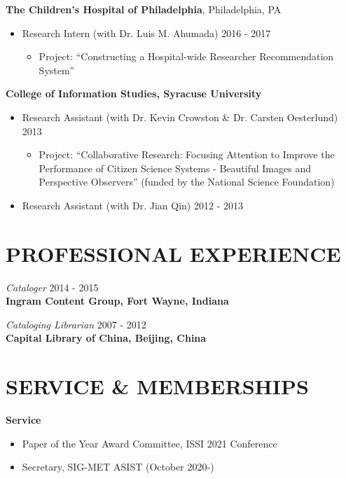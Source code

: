 \documentclass[margin, 10pt]{res} %
\begin{document}
\begin{resume}
\textbf{The Children's Hospital of Philadelphia}, Philadelphia, PA\\
\begin{itemize}
     \item Research Intern (with Dr. Luis M. Ahumada) \hfill 2016 - 2017
     \begin{itemize}
     	\item  Project: “Constructing a Hospital-wide Researcher Recommendation System”
   	\end{itemize}
\end{itemize}

\textbf{College of Information Studies, Syracuse University}\\
\begin{itemize}
	\item Research Assistant (with Dr. Kevin Crowston \& Dr. Carsten Oesterlund) \hfill 2013
    \begin{itemize}
     	\item Project: “Collaborative Research: Focusing Attention to Improve the Performance of Citizen Science Systems - Beautiful Images and Perspective Observers” (funded by the National Science Foundation)
    \end{itemize}
    \item Research Assistant (with Dr. Jian Qin) \hfill 2012 - 2013
\end{itemize}

\section{PROFESSIONAL EXPERIENCE}

\textit{Cataloger} \hfill 2014 - 2015\\
\textbf{Ingram Content Group, Fort Wayne, Indiana}

\textit{Cataloging Librarian} \hfill 2007 - 2012\\
\textbf{Capital Library of China, Beijing, China}

\section{SERVICE \& MEMBERSHIPS}

\textbf{Service}
\begin{itemize}
\item Paper of the Year Award Committee, ISSI 2021 Conference
\item Secretary, SIG-MET ASIST (October 2020-)
\end{itemize}



\end{resume}
\end{document}
